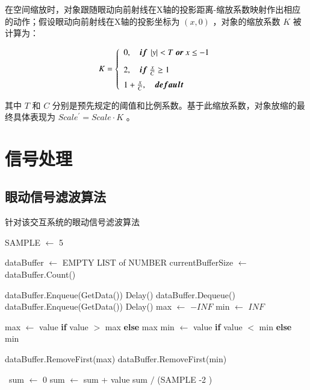 在空间缩放时，对象跟随眼动向前射线在X轴的投影距离-缩放系数映射作出相应的动作；假设眼动向前射线在X轴的投影坐标为 $(x, 0)$ ，对象的缩放系数 $K$ 被计算为：

\begin{equation}
	\label{formula-3-7}
	K = 
    \left\{
    \begin{array}{l}
        0, \quad {\mbox{\boldmath $if$}}\ \left|y\right| < T\ {\mbox{\boldmath $or$}}\ x \le -1 \\ [0.3cm]
        2, \quad {\mbox{\boldmath $if$}}\ \frac{x}{C} \ge 1 \\ [0.2cm]
        1 + \frac{x}{C},\quad {\mbox{\boldmath $default$}}
    \end{array}
    \right.
\end{equation}

其中 $T$ 和 $C$ 分别是预先规定的阈值和比例系数。基于此缩放系数，对象放缩的最终具体表现为 $Scale^\prime = Scale \cdot K$ 。

\section{信号处理}

\subsection{眼动信号滤波算法}

\begin{algorithm}[t!]
    \caption{针对该交互系统的眼动信号滤波算法}
	\begin{algorithmic}[1]
        \State SAMPLE $\leftarrow$ 5
 
        \State dataBuffer $\leftarrow$ EMPTY LIST of NUMBER
        \State currentBufferSize $\leftarrow$ dataBuffer.Count()

            \State dataBuffer.Enqueue(GetData())
            \State Delay()
        \EndFor
        \Else
        \State dataBuffer.Dequeue()
        \State dataBuffer.Enqueue(GetData())
        \State Delay()
        \EndIf
        \State
        \State max $\leftarrow$ $-INF$
        \State min $\leftarrow$ $INF$
        
            \State max $\leftarrow$ value \textbf{if} value $>$ max \textbf{else} max
            \State min $\leftarrow$ value \textbf{if} value $<$ min \textbf{else} min
        \EndFor

        \State dataBuffer.RemoveFirst(max)
        \State dataBuffer.RemoveFirst(min)  

        \
        \State sum $\leftarrow$ 0
            \State sum $\leftarrow$ sum + value
        \EndFor
        \State \Return sum $/$ (SAMPLE -2 )
	\end{algorithmic} 
	\label{algorithm-3-1}
\end{algorithm} 

